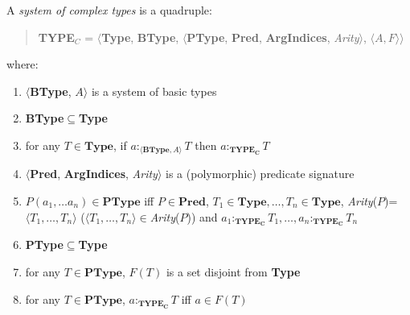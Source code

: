 \begin{ex} 
A {\it system of complex types\/} is a quadruple:
\begin{quote}
{\bf TYPE$_C$} = $\langle${\bf Type}, {\bf BType},
$\langle$\textbf{PType}, {\bf Pred}, \textbf{ArgIndices}, {\it Arity\/}$\rangle$, $\langle A,F\rangle$$\rangle$
\end{quote}
where:  
\begin{enumerate} 
 
\item $\langle$\textbf{BType}, $A$$\rangle$ is a system of basic types 
 
\item \textbf{BType}$\subseteq$\textbf{Type}

\item for any $T\in\textbf{Type}$, if $a:_{\langle\mathbf{BType},
    A\rangle}T$ then $a:_{\mathbf{TYPE_C}}T$

\item \label{cl:predtypes}$\langle${\bf Pred}, \textbf{ArgIndices},
  {\it Arity\/}$\rangle$ is a (polymorphic) predicate
  signature

\item\hspace*{-1ex} %
  $P(a_1,\ldots a_n)\in\textbf{PType}$ iff $P\in\textbf{Pred}$, $T_1\in \mathbf{Type},\ldots,T_n\in
  \mathbf{Type}$, \textit{Arity}($P$)=$\langle
  T_1,\ldots,T_n\rangle$  ($\langle
  T_1,\ldots,T_n\rangle$$\in$\textit{Arity}($P$)) and $a_1:_{\mathbf{TYPE_C}}T_1,\ldots,a_n:_{\mathbf{TYPE_C}}T_n$




\item \textbf{PType}$\subseteq$\textbf{Type}

\item for any $T\in\textbf{PType}$, $F(T)$ is a set disjoint from \textbf{Type}

\item for any $T\in\textbf{PType}$, $a:_{\mathbf{TYPE_C}}T$ iff $a\in F(T)$
 
\end{enumerate} 
\label{ex:comp-types}
\end{ex} 
